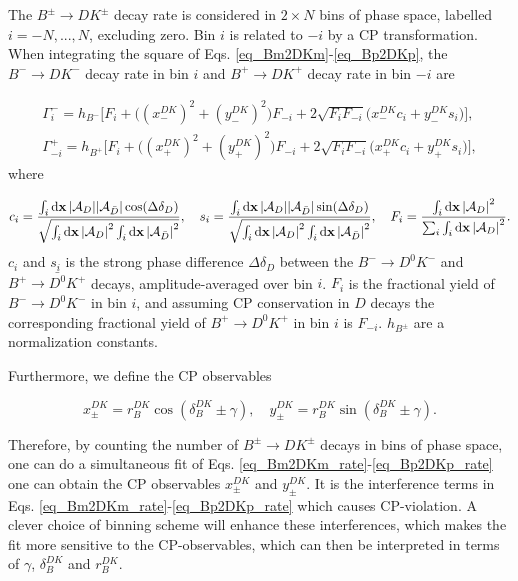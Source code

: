 \documentclass[12pt, a4paper, notitlepage, onecolumn]{article}
\numberwithin{equation}{section}
\begin{document}
The $B^\pm\to DK^\pm$ decay rate is considered in $2\times N$ bins of phase space, labelled $i = -N, ..., N$, excluding zero. Bin $i$ is related to $-i$ by a CP transformation. When integrating the square of Eqs. \eqref{eq_Bm2DKm}-\eqref{eq_Bp2DKp}, the $B^-\to DK^-$ decay rate in bin $i$ and $B^+\to DK^+$ decay rate in bin $-i$ are

\begin{align}
  \Gamma^-_i = h_{B^-}\Big[F_i + \big((x_-^{DK})^2 + (y_-^{DK})^2\big)F_{-i} + 2\sqrt{F_iF_{-i}}\big(x_-^{DK}c_i + y_-^{DK}s_i\big)\Big], \label{eq_Bm2DKm_rate} \\
  \Gamma^+_{-i} = h_{B^+}\Big[F_i + \big((x_+^{DK})^2 + (y_+^{DK})^2\big)F_{-i} + 2\sqrt{F_iF_{-i}}\big(x_+^{DK}c_i + y_+^{DK}s_i\big)\Big], \label{eq_Bp2DKp_rate}
\end{align}
where

\begin{equation*}
  c_i = \frac{\int_i\dd{\vb{x}}\abs{\mathcal{A}_D}\abs{\mathcal{A}_{\bar{D}}}\cos(\Delta\delta_D)}{\sqrt{\int_i\dd{\vb{x}}\abs{\mathcal{A}_D}^2\int_i\dd{\vb{x}}\abs{\mathcal{A}_{\bar{D}}}^2}}, \quad s_i = \frac{\int_i\dd{\vb{x}}\abs{\mathcal{A}_D}\abs{\mathcal{A}_{\bar{D}}}\sin(\Delta\delta_D)}{\sqrt{\int_i\dd{\vb{x}}\abs{\mathcal{A}_D}^2\int_i\dd{\vb{x}}\abs{\mathcal{A}_{\bar{D}}}^2}}, \quad F_i = \frac{\int_i\dd{\vb{x}}\abs{\mathcal{A}_D}^2}{\sum_i\int_i\dd{\vb{x}}\abs{\mathcal{A}_D}^2}.
\end{equation*}
$c_i$ and $s_i$ is the strong phase difference $\Delta\delta_D$ between the $B^-\to D^0K^-$ and $B^+\to\bar{D^0}K^+$ decays, amplitude-averaged over bin $i$. $F_i$ is the fractional yield of $B^-\to D^0K^-$ in bin $i$, and assuming CP conservation in $D$ decays the corresponding fractional yield of $B^+\to D^0K^+$ in bin $i$ is $F_{-i}$. $h_{B^\pm}$ are a normalization constants.

Furthermore, we define the CP observables

\begin{equation*}
  x_\pm^{DK} = r_B^{DK}\cos(\delta_B^{DK}\pm\gamma), \quad  y_\pm^{DK} = r_B^{DK}\sin(\delta_B^{DK}\pm\gamma).
\end{equation*}

Therefore, by counting the number of $B^\pm\to DK^\pm$ decays in bins of phase space, one can do a simultaneous fit of Eqs. \eqref{eq_Bm2DKm_rate}-\eqref{eq_Bp2DKp_rate} one can obtain the CP observables $x_\pm^{DK}$ and $y_\pm^{DK}$. It is the interference terms in Eqs. \eqref{eq_Bm2DKm_rate}-\eqref{eq_Bp2DKp_rate} which causes CP-violation. A clever choice of binning scheme will enhance these interferences, which makes the fit more sensitive to the CP-observables, which can then be interpreted in terms of $\gamma$, $\delta_B^{DK}$ and $r_B^{DK}$.
\end{document}
